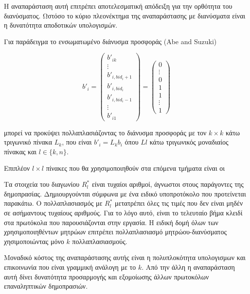 \documentclass[a4paper,11pt]{article}
\begin{document}
Η αναπαράσταση αυτή επιτρέπει αποτελεσματική απόδειξη για την ορθότητα του διανύσματος. Ωστόσο το κύριο πλεονέκτημα της αναπαράστασης με
διανύσματα είναι η δυνατότητα αποδοτικών υπολογισμών.

Για παράδειγμα το ενσωματωμένο διάνυσμα προσφοράς (Abe and Suzuki)

\begin{displaymath}
	b'_i = 
	\left ( \begin{array}{c}
		b'_{ik}	\\
		\vdots	\\
		b'_{i,bid_i+1} \\
		b'_{i,bid_i}	\\
		b'_{i,bid_i-1} \\
		\vdots \\
		b'_{i1}
	\end{array} \right)
	=
	\left ( \begin{array}{c}
	0	\\
	\vdots \\
	0 \\
	1 \\
	1 \\
	\vdots \\
	1
	\end{array} \right)
\end{displaymath}

μπορεί να προκύψει πολλαπλασιάζοντας το διάνυσμα προσφοράς με τον $k×k$ κάτω τριγωνικό πίνακα $L_k$, που είναι $b'_i=L_kb_i$ 
όπου $Ll$ κάτω τριγωνικός μοναδιαίος πίνακας και $l \in \{k,n\}$.

Επιπλέον $l×l$ πίνακες που θα χρησιμοποιηθούν στα επόμενα τμήματα είναι οι


Tα στοιχεία του διαγωνίου $R^*_l$ είναι τυχαίοι αριθμοί, άγνωστοι στους παράγοντες της δημοπρασίας. Δημιουργούνται σύμφωνα με ένα ειδικό
υποπροτόκολο που προτείνεται παρακάτω. Ο πολλαπλασιασμός με $R^*_l$ μετατρέπει όλες τις τιμές που δεν είναι μηδέν σε ασήμαντους τυχαίους αριθμούς.
Για το λόγο αυτό, είναι το τελευταίο βήμα κλειδί στα πρωτόκολα που παρουσιάζονται στην εργασία. Η ειδική δομή όλων των χρησιμοποιηθέντων μητρώων
επιτρέπει πολλαπλασιασμό μητρώου-διανύσματος χησιμοποιώντας μόνο $k$ πολλαπλασιασμούς.

Μοναδικό κόστος της αναπαράστασης αυτής είναι η πολυπλοκότητα υπολογισμων και επικοινωνία που είναι γραμμική ανάλογη με το $k$. Από την άλλη η
αναπαράσταση αυτή δίνει δυνατότητα προσαρμογής και εξομοίωσης άλλων πρωτοκόλων επαναληπτικών δημοπρασιών.
\end{document}
